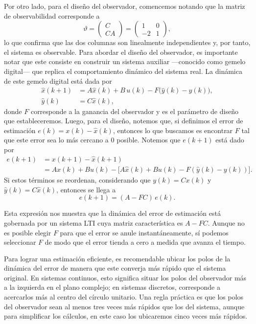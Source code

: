 \documentclass[
  11pt,
  letterpaper,
   addpoints,
  answers
  ]{exam}
\begin{document}
\begin{questions}
\begin{solution}
Por otro lado, para el diseño del observador, comencemos notando que la matriz de observabilidad corresponde a
\begin{equation}
\vartheta=\begin{pmatrix}C\\ CA\end{pmatrix}=
\begin{pmatrix}
1 & 0\\
-2 & 1
\end{pmatrix},
\end{equation}
lo que confirma que las dos columnas son linealmente independientes y, por tanto, el sistema es observable. Para abordar el diseño del observador, es importante notar que este consiste en construir un sistema auxiliar —conocido como gemelo digital— que replica el comportamiento dinámico del sistema real. La dinámica de este gemelo digital está dada por
\begin{align}
\hat{x}(k+1)&=A\hat{x}(k)+B\,u(k)-F\big(\hat{y}(k)-y(k)\big),\\
\hat{y}(k)&=C\hat{x}(k),
\end{align}
donde $F$ corresponde a la ganancia del observador y es el parámetro de diseño que estableceremos. Luego, para el diseño, notemos que, si definimos el error de estimación $e(k)=x(k)-\hat{x}(k)$, entonces lo que buscamos es encontrar $F$ tal que este error sea lo más cercano a $0$ posible. Notemos que $e(k+1)$ está dado por
\begin{align}
e(k+1)&=x(k+1)-\hat{x}(k+1)\\
&=Ax(k)+Bu(k)-\big[A\hat{x}(k)+Bu(k)-F(\hat{y}(k)-y(k))\big].
\end{align}
Si estos términos se reordenan, considerando que $y(k)=Cx(k)$ y $\hat{y}(k)=C\hat{x}(k)$, entonces se llega a
\begin{equation}
e(k+1)=(A-FC)\,e(k).
\end{equation}

Esta expresión nos muestra que la dinámica del error de estimación está gobernada por un sistema LTI cuya matriz característica es $A-FC$. Aunque no es posible elegir $F$ para que el error se anule instantáneamente, sí podemos seleccionar $F$ de modo que el error tienda a cero a medida que avanza el tiempo.

Para lograr una estimación eficiente, es recomendable ubicar los polos de la dinámica del error de manera que este converja más rápido que el sistema original. En sistemas continuos, esto significa situar los polos del observador más a la izquierda en el plano complejo; en sistemas discretos, corresponde a acercarlos más al centro del círculo unitario. Una regla práctica es que los polos del observador sean al menos tres veces más rápidos que los del sistema, aunque para simplificar los cálculos, en este caso los ubicaremos cinco veces más rápidos.


\end{solution}
\end{questions}
\end{document}
